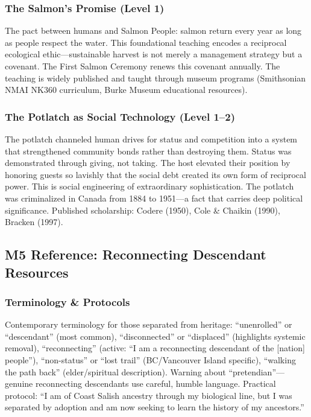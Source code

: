 \documentclass[11pt,letterpaper]{article}
\begin{document}
\subsubsection{The Salmon's Promise (Level 1)}

The pact between humans and Salmon People: salmon return every year as long as people respect the water. This foundational teaching encodes a reciprocal ecological ethic---sustainable harvest is not merely a management strategy but a covenant. The First Salmon Ceremony renews this covenant annually. The teaching is widely published and taught through museum programs (Smithsonian NMAI NK360 curriculum, Burke Museum educational resources).

\subsubsection{The Potlatch as Social Technology (Level 1--2)}

The potlatch channeled human drives for status and competition into a system that strengthened community bonds rather than destroying them. Status was demonstrated through giving, not taking. The host elevated their position by honoring guests so lavishly that the social debt created its own form of reciprocal power. This is social engineering of extraordinary sophistication. The potlatch was criminalized in Canada from 1884 to 1951---a fact that carries deep political significance. Published scholarship: Codere (1950), Cole \& Chaikin (1990), Bracken (1997).

\subsection{M5 Reference: Reconnecting Descendant Resources}

\subsubsection{Terminology \& Protocols}

Contemporary terminology for those separated from heritage: ``unenrolled'' or ``descendant'' (most common), ``disconnected'' or ``displaced'' (highlights systemic removal), ``reconnecting'' (active: ``I am a reconnecting descendant of the [nation] people''), ``non-status'' or ``lost trail'' (BC/Vancouver Island specific), ``walking the path back'' (elder/spiritual description). Warning about ``pretendian''---genuine reconnecting descendants use careful, humble language. Practical protocol: ``I am of Coast Salish ancestry through my biological line, but I was separated by adoption and am now seeking to learn the history of my ancestors.''
\end{document}
